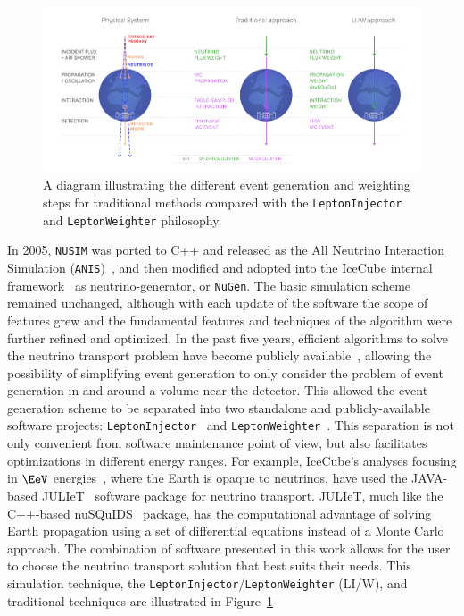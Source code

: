 \documentclass[main.tex]{subfiles}
\newcommand{\LeptonInjector}{\texttt{LeptonInjector}}
\newcommand{\LeptonWeighter}{\texttt{LeptonWeighter}}
\newcommand{\NuGen}{\texttt{NuGen}}
\newcommand{\ANIS}{\texttt{ANIS}}
\newcommand{\nusim}{\texttt{NUSIM}}
\begin{document}
\begin{figure}
    \centering
    \includegraphics[width=\linewidth]{figures/nufsgen.pdf}
    \caption{A diagram illustrating the different event generation and weighting steps for traditional methods compared with the \LeptonInjector{} and \LeptonWeighter{} philosophy.}
    \label{fig:nufsgen}
\end{figure}

In 2005, \nusim{} was ported to {\ttf C++} and released as the All Neutrino Interaction Simulation (\ANIS)~\cite{Gazizov:2004va}, and then modified and adopted into the IceCube internal framework~\cite{DeYoung:865626} as neutrino-generator, or \NuGen{}. 
The basic simulation scheme remained unchanged, although with each update of the software the scope of features grew and the fundamental features and techniques of the algorithm were further refined and optimized. 
In the past five years, efficient algorithms to solve the neutrino transport problem have become publicly available~\cite{Yoshida:2003js,Arguelles:2020hss,arguelles:2015nu,Zas:2017xdj,Vincent:2017svp,Safa:2019ege,Garcia:2020jwr}, allowing the possibility of simplifying event generation to only consider the problem of event generation in and around a volume near the detector.
This allowed the event generation scheme to be separated into two standalone and publicly-available software projects: \LeptonInjector{}~\cite{LeptonInjectorRepository} and \LeptonWeighter{}~\cite{LeptonWeighterRepository}.
This separation is not only convenient from software maintenance point of view, but also facilitates optimizations in different energy ranges. 
For example, IceCube's analyses focusing in $\si\EeV$ energies~\cite{Aartsen:2018vtx}, where the Earth is opaque to neutrinos, have used the JAVA-based JULIeT~\cite{Yoshida:2003js,shigeruyoshida_2020_4018117} software package for neutrino transport.
JULIeT, much like the {\ttf C++}-based nuSQuIDS~\cite{Arguelles:2020hss,arguelles:2015nu} package, has the computational advantage of solving Earth propagation using a set of differential equations instead of a Monte Carlo approach.
The combination of software presented in this work allows for the user to choose the neutrino transport solution that best suits their needs.
This simulation technique, the \LeptonInjector{}/\LeptonWeighter{} (LI/W), and traditional techniques are illustrated in Figure~\ref{fig:nufsgen}
\end{document}
